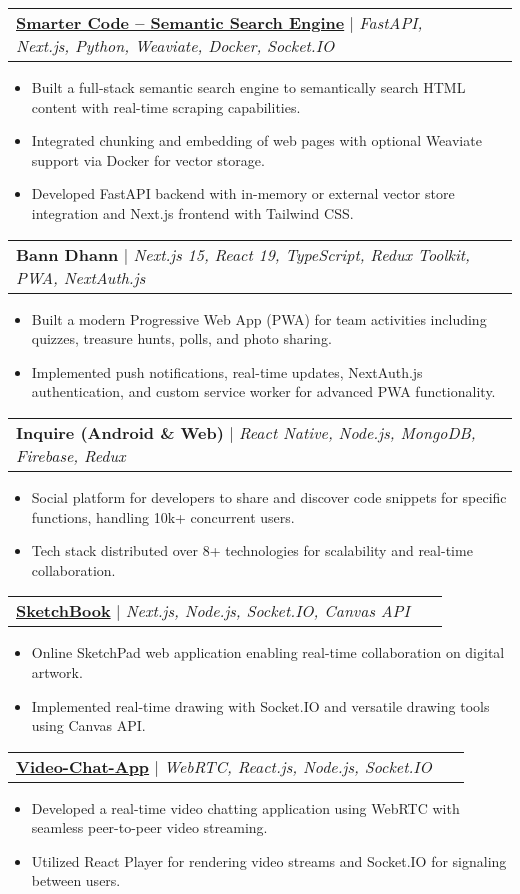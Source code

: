 \documentclass[letterpaper,11pt]{article}
\makeatletter
\newcommand{\resumeItem}[1]{
  \item\small{
    {#1 \vspace{-2pt}}
  }
}
\newcommand{\resumeProjectHeading}[2]{
    \item
    \begin{tabular*}{1.001\textwidth}{l@{\extracolsep{\fill}}r}
      \small#1 & \textbf{\small #2}\
    \end{tabular*}\vspace{-7pt}
}
\newcommand{\resumeItemListStart}{\begin{itemize}}
\newcommand{\resumeItemListEnd}{\end{itemize}\vspace{-5pt}}
\makeatother
\begin{document}
      \resumeProjectHeading
          {\textbf{\href{https://github.com/codecraft26/smarter.codes}{Smarter Code -- Semantic Search Engine}} $|$ \emph{FastAPI, Next.js, Python, Weaviate, Docker, Socket.IO}}{}
          \resumeItemListStart
            \resumeItem{Built a full-stack semantic search engine to semantically search HTML content with real-time scraping capabilities.}
            \resumeItem{Integrated chunking and embedding of web pages with optional Weaviate support via Docker for vector storage.}
            \resumeItem{Developed FastAPI backend with in-memory or external vector store integration and Next.js frontend with Tailwind CSS.}
          \resumeItemListEnd
          \vspace{-13pt}
          
      \resumeProjectHeading
          {\textbf{Bann Dhann} $|$ \emph{Next.js 15, React 19, TypeScript, Redux Toolkit, PWA, NextAuth.js}}{}
          \resumeItemListStart
            \resumeItem{Built a modern Progressive Web App (PWA) for team activities including quizzes, treasure hunts, polls, and photo sharing.}
            \resumeItem{Implemented push notifications, real-time updates, NextAuth.js authentication, and custom service worker for advanced PWA functionality.}
          \resumeItemListEnd
          \vspace{-13pt}
          
      \resumeProjectHeading
          {\textbf{Inquire (Android \& Web)} $|$ \emph{React Native, Node.js, MongoDB, Firebase, Redux}}{}
          \resumeItemListStart
            \resumeItem{Social platform for developers to share and discover code snippets for specific functions, handling 10k+ concurrent users.}
            \resumeItem{Tech stack distributed over 8+ technologies for scalability and real-time collaboration.}
          \resumeItemListEnd
          \vspace{-13pt}
          
      \resumeProjectHeading
          {\textbf{\href{https://github.com/codecraft26/sketch-book}{SketchBook}} $|$ \emph{Next.js, Node.js, Socket.IO, Canvas API}}{}
          \resumeItemListStart
            \resumeItem{Online SketchPad web application enabling real-time collaboration on digital artwork.}
            \resumeItem{Implemented real-time drawing with Socket.IO and versatile drawing tools using Canvas API.}
          \resumeItemListEnd
          \vspace{-13pt}
          
      \resumeProjectHeading
          {\textbf{\href{https://github.com/codecraft26/video-chat-webrtc}{Video-Chat-App}} $|$ \emph{WebRTC, React.js, Node.js, Socket.IO}}{}
          \resumeItemListStart
            \resumeItem{Developed a real-time video chatting application using WebRTC with seamless peer-to-peer video streaming.}
            \resumeItem{Utilized React Player for rendering video streams and Socket.IO for signaling between users.}
          \resumeItemListEnd
          
\end{document}
